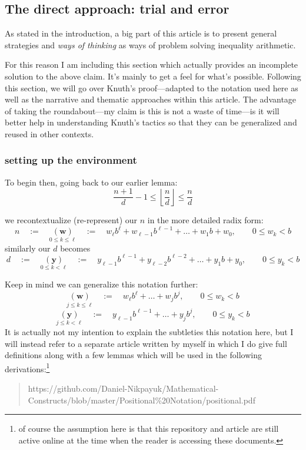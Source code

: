 \documentclass[twoside]{article}
\newcommand{\bradix}[2][u]{\ensuremath{\underset{#2}{(\bm{#1})}}}
\begin{document}
\subsection*{The direct approach: trial and error}

As stated in the introduction, a big part of this article is to present general strategies and \emph{ways of thinking}
as ways of problem solving inequality arithmetic.

For this reason I am including this section which actually provides an incomplete solution to the above claim. It's mainly
to get a feel for what's possible. Following this section, we will go over Knuth's proof---adapted to the notation used here
as well as the narrative and thematic approaches within this article. The advantage of taking the roundabout---my
claim is this is not a waste of time---is it will better help in understanding Knuth's tactics so that they can be generalized
and reused in other contexts.

\subsubsection*{setting up the environment}

To begin then, going back to our earlier lemma:
$$ \frac{n+1}{d}-1 \le\left\lfloor\frac{n}{d}\right\rfloor\le\frac{n}{d} $$

we recontextualize (re-represent) our $ n $ in the more detailed radix form:
$$ n\quad :=\quad\bradix[w]{0\le k\le\ell}\quad :=\quad w_\ell b^\ell+w_{\ell-1} b^{\ell-1}+\ldots+w_1b+w_0,\qquad 0\le w_k < b $$
similarly our $ d $ becomes
$$ d\quad :=\quad\bradix[y]{0\le k < \ell}\quad :=\quad y_{\ell-1}b^{\ell-1}+y_{\ell-2}b^{\ell-2}+\ldots+y_1b+y_0,\qquad 0\le y_k < b $$

Keep in mind we can generalize this notation further:
$$ \bradix[w]{j\le k\le\ell}\quad :=\quad w_\ell b^\ell+\ldots+w_jb^j,\qquad 0\le w_k < b $$
$$ \bradix[y]{j\le k < \ell}\quad :=\quad y_{\ell-1}b^{\ell-1}+\ldots+y_jb^j,\qquad 0\le y_k < b $$
It is actually not my intention to explain the subtleties this notation here, but I will instead refer to
a separate article written by myself in which I do give full definitions along with a few lemmas which will
be used in the following derivations:\footnote{of course the assumption here is that this repository and
article are still active online at the time when the reader is accessing these documents.}
\begin{verse}
https://github.com/Daniel-Nikpayuk/Mathematical-Constructs/blob/master/Positional\%20Notation/positional.pdf
\end{verse}
\end{document}
